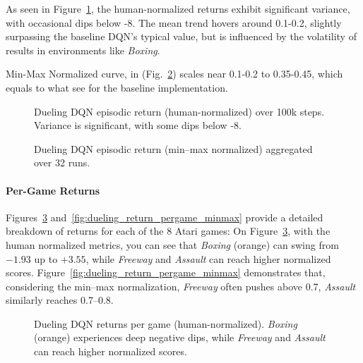 As seen in  Figure~\ref{fig:dueling_return_human}, the human-normalized returns exhibit significant variance, with occasional dips below -8. The mean trend hovers around 0.1-0.2, slightly surpassing the baseline DQN's typical value, but is influenced by the volatility of results in environments like \emph{Boxing}.

Min-Max Normalized curve, in (Fig.~\ref{fig:dueling_return_minmax}) scales near 0.1-0.2 to 0.35-0.45, which equals to what see for the baseline implementation.

\begin{figure}
	\centering
	
	\caption{Dueling DQN episodic return (human-normalized) over 100k steps. 
		Variance is significant, with some dips below -8.}
	\label{fig:dueling_return_human}
\end{figure}

\begin{figure}
	\centering
	
	\caption{Dueling DQN episodic return (min--max normalized) aggregated over 32 runs.}
	\label{fig:dueling_return_minmax}
\end{figure}

\paragraph{Per-Game Returns}
Figures~\ref{fig:dueling_return_pergame_human} and~\ref{fig:dueling_return_pergame_minmax} 
provide a detailed breakdown of returns for each of the 8 Atari games:
On Figure~\ref{fig:dueling_return_pergame_human}, with the human normalized metrics, you can see that \emph{Boxing} (orange) can swing from $-1.93$ up to $+3.55$, while \emph{Freeway} and \emph{Assault} can reach higher normalized scores.
Figure~\ref{fig:dueling_return_pergame_minmax} demonstrates that, considering the min--max normalization, \emph{Freeway} often pushes above 0.7, \emph{Assault} similarly reaches 0.7--0.8.

\begin{figure}
	\centering
	
	\caption{Dueling DQN returns per game (human-normalized). 
		\emph{Boxing} (orange) experiences deep negative dips, while \emph{Freeway} and \emph{Assault} can reach higher normalized scores.}
	\label{fig:dueling_return_pergame_human}
\end{figure}

